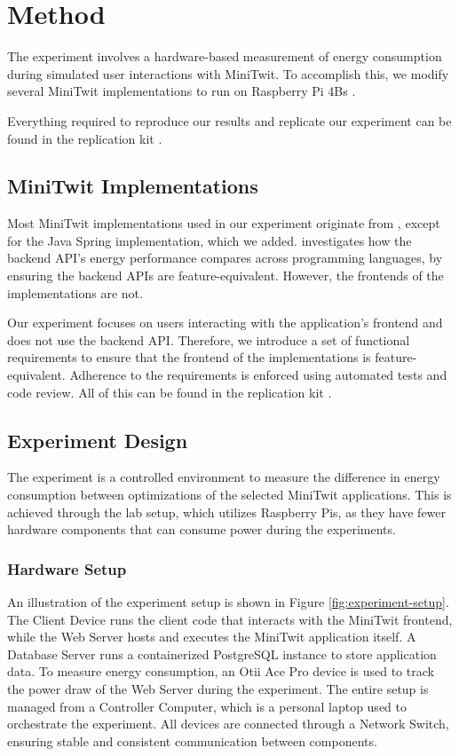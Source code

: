 \documentclass[main.tex]{subfiles}
\begin{document}
\section{Method}
\label{section:method}
The experiment involves a hardware-based measurement of energy consumption during simulated user interactions with MiniTwit. To accomplish this, we modify several MiniTwit implementations to run on Raspberry Pi 4Bs \cite{raspberrypi2025productbrief}.

Everything required to reproduce our results and replicate our experiment can be found in the replication kit \cite{replication-kit-Karlsen_Landsgaard_Offenberg_Pedersen_2025}.

\subsection{MiniTwit Implementations}
Most MiniTwit implementations used in our experiment originate from \textcite{Pfeiffer_Trindade_Meding_Harwick} , except for the Java Spring implementation, which we added. \textcite{Pfeiffer_Trindade_Meding_Harwick} investigates how the backend API's energy performance compares across programming languages, by ensuring the backend APIs are feature-equivalent. However, the frontends of the implementations are not.

Our experiment focuses on users interacting with the application's frontend and does not use the backend API. Therefore, we introduce a set of functional requirements to ensure that the frontend of the implementations is feature-equivalent. Adherence to the requirements is enforced using automated tests and code review. All of this can be found in the replication kit \cite{replication-kit-Karlsen_Landsgaard_Offenberg_Pedersen_2025}. 

\subsection{Experiment Design}
The experiment is a controlled environment to measure the difference in energy consumption between optimizations of the selected MiniTwit applications. This is achieved through the lab setup, which utilizes Raspberry Pis, as they have fewer hardware components that can consume power during the experiments.

\subsubsection{Hardware Setup}
An illustration of the experiment setup is shown in Figure \ref{fig:experiment-setup}. The Client Device runs the client code that interacts with the MiniTwit frontend, while the Web Server hosts and executes the MiniTwit application itself. A Database Server runs a containerized PostgreSQL instance to store application data. To measure energy consumption, an Otii Ace Pro \cite{qoitech_otii_ace_pro} device is used to track the power draw of the Web Server during the experiment. The entire setup is managed from a Controller Computer, which is a personal laptop used to orchestrate the experiment. All devices are connected through a Network Switch, ensuring stable and consistent communication between components.
\end{document}
